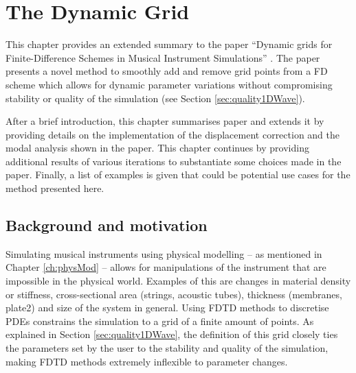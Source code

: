 \chapter{The Dynamic Grid}\label{ch:dynamicGrid}
This chapter provides an extended summary to the paper ``Dynamic grids for Finite-Difference Schemes in Musical Instrument Simulations'' \citeP[G]. The paper presents a novel method to smoothly add and remove grid points from a FD scheme which allows for dynamic parameter variations without compromising stability or quality of the simulation (see Section \ref{sec:quality1DWave}). 

After a brief introduction, this chapter summarises paper \citeP[G] and extends it by providing details on the implementation of the displacement correction and the modal analysis shown in the paper. This chapter continues by providing additional results of various iterations to substantiate some choices made in the paper. Finally, a list of examples is given that could be potential use cases for the method presented here. 

\section{Background and motivation}
Simulating musical instruments using physical modelling -- as mentioned in Chapter \ref{ch:physMod} -- allows for manipulations of the instrument that are impossible in the physical world. Examples of this are changes in material density or stiffness, cross-sectional area (strings, acoustic tubes), thickness (membranes, plate2) and size of the system in general. Using FDTD methods to discretise PDEs constrains the simulation to a grid of a finite amount of points. As explained in Section \ref{sec:quality1DWave}, the definition of this grid closely ties the parameters set by the user to the stability and quality of the simulation, making FDTD methods extremely inflexible to parameter changes. 

